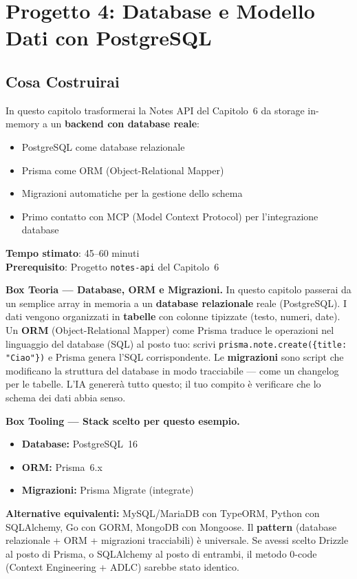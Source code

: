 \chapter{Progetto 4: Database e Modello Dati con PostgreSQL}

\section*{Cosa Costruirai}
In questo capitolo trasformerai la Notes API del Capitolo~6 da storage in-memory a un \textbf{backend con database reale}:
\begin{itemize}
  \item PostgreSQL come database relazionale
  \item Prisma come ORM (Object-Relational Mapper)
  \item Migrazioni automatiche per la gestione dello schema
  \item Primo contatto con MCP (Model Context Protocol) per l'integrazione database
\end{itemize}

\textbf{Tempo stimato}: 45--60 minuti\\
\textbf{Prerequisito}: Progetto \texttt{notes-api} del Capitolo~6

\begin{notebox}
\textbf{Box Teoria --- Database, ORM e Migrazioni.} In questo capitolo passerai da un semplice array in memoria a un \textbf{database relazionale} reale (PostgreSQL). I dati vengono organizzati in \textbf{tabelle} con colonne tipizzate (testo, numeri, date). Un \textbf{ORM} (Object-Relational Mapper) come Prisma traduce le operazioni nel linguaggio del database (SQL) al posto tuo: scrivi \texttt{prisma.note.create(\{title: "Ciao"\})} e Prisma genera l'SQL corrispondente. Le \textbf{migrazioni} sono script che modificano la struttura del database in modo tracciabile --- come un changelog per le tabelle. L'IA genererà tutto questo; il tuo compito è verificare che lo schema dei dati abbia senso.
\end{notebox}

\begin{notebox}
\textbf{Box Tooling --- Stack scelto per questo esempio.}
\begin{itemize}
  \item \textbf{Database:} PostgreSQL~16
  \item \textbf{ORM:} Prisma~6.x
  \item \textbf{Migrazioni:} Prisma Migrate (integrate)
\end{itemize}
\textbf{Alternative equivalenti:} MySQL/MariaDB con TypeORM, Python con SQLAlchemy, Go con GORM, MongoDB con Mongoose. Il \textbf{pattern} (database relazionale + ORM + migrazioni tracciabili) è universale. Se avessi scelto Drizzle al posto di Prisma, o SQLAlchemy al posto di entrambi, il metodo 0-code (Context Engineering + ADLC) sarebbe stato identico.
\end{notebox}


